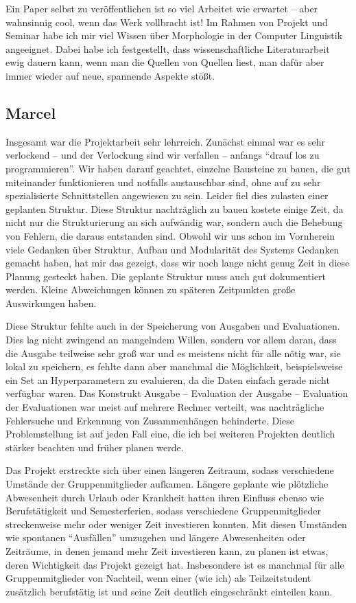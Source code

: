 \documentclass[11pt,a4paper]{article}
\begin{document}
Ein Paper selbst zu veröffentlichen ist so viel Arbeitet wie erwartet -- aber wahnsinnig cool, wenn das Werk vollbracht ist!
Im Rahmen von Projekt und Seminar habe ich mir viel Wissen über Morphologie in der Computer Linguistik angeeignet.
Dabei habe ich festgestellt, dass wissenschaftliche Literaturarbeit ewig dauern kann, wenn man die Quellen von Quellen liest, man dafür aber immer wieder auf neue, spannende Aspekte stößt.

\subsection{Marcel}
Insgesamt war die Projektarbeit sehr lehrreich. Zunächst einmal war es sehr verlockend -- und der Verlockung sind wir verfallen -- anfangs \enquote{drauf los zu programmieren}. Wir haben darauf geachtet, einzelne Bausteine zu bauen, die gut miteinander funktionieren und notfalls austauschbar sind, ohne auf zu sehr spezialisierte Schnittstellen angewiesen zu sein. Leider fiel dies zulasten einer geplanten Struktur. Diese Struktur nachträglich zu bauen kostete einige Zeit, da nicht nur die Strukturierung an sich aufwändig war, sondern auch die Behebung von Fehlern, die daraus entstanden sind. Obwohl wir uns schon im Vornherein viele Gedanken über Struktur, Aufbau und Modularität des Systems Gedanken gemacht haben, hat mir das gezeigt, dass wir noch lange nicht genug Zeit in diese Planung gesteckt haben. Die geplante Struktur muss auch gut dokumentiert werden. Kleine Abweichungen können zu späteren Zeitpunkten große Auswirkungen haben.

Diese Struktur fehlte auch in der Speicherung von Ausgaben und Evaluationen. Dies lag nicht zwingend an mangelndem Willen, sondern vor allem daran, dass die Ausgabe teilweise sehr groß war und es meistens nicht für alle nötig war, sie lokal zu speichern, es fehlte dann aber manchmal die Möglichkeit, beispielsweise ein Set an Hyperparametern zu evaluieren, da die Daten einfach gerade nicht verfügbar waren. Das Konstrukt Ausgabe -- Evaluation der Ausgabe -- Evaluation der Evaluationen war meist auf mehrere Rechner verteilt, was nachträgliche Fehlersuche und Erkennung von Zusammenhängen behinderte. Diese Problemstellung ist auf jeden Fall eine, die ich bei weiteren Projekten deutlich stärker beachten und früher planen werde.

Das Projekt erstreckte sich über einen längeren Zeitraum, sodass verschiedene Umstände der Gruppenmitglieder aufkamen. Längere geplante wie plötzliche Abwesenheit durch Urlaub oder Krankheit hatten ihren Einfluss ebenso wie Berufstätigkeit und Semesterferien, sodass verschiedene Gruppenmitglieder streckenweise mehr oder weniger Zeit investieren konnten. Mit diesen Umständen wie spontanen \enquote{Ausfällen} umzugehen und längere Abwesenheiten oder Zeiträume, in denen jemand mehr Zeit investieren kann, zu planen ist etwas, deren Wichtigkeit das Projekt gezeigt hat. Insbesondere ist es manchmal für alle Gruppenmitglieder von Nachteil, wenn einer (wie ich) als Teilzeitstudent zusätzlich berufstätig ist und seine Zeit deutlich eingeschränkt einteilen kann.
\end{document}
